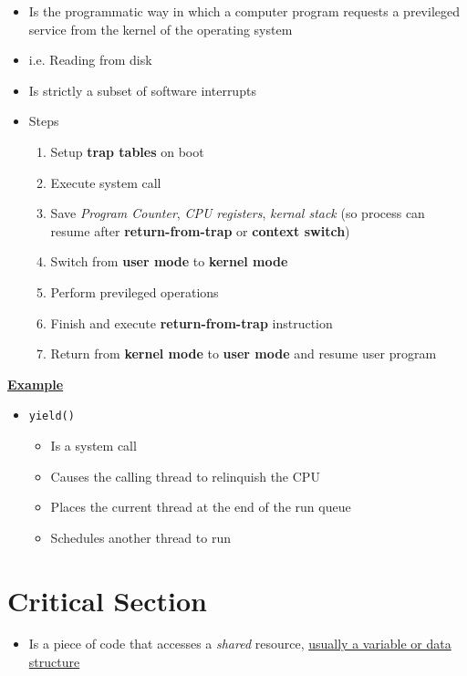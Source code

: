 \documentclass[12pt]{article}
\begin{document}
\begin{itemize}
    \item Is the programmatic way in which a computer program requests a previleged service from the kernel of the operating system
    \item i.e. Reading from disk
    \item Is strictly a subset of software interrupts
    \item Steps

    \begin{enumerate}[1)]
        \item Setup \textbf{trap tables} on boot
        \item Execute system call
        \item Save \textit{Program Counter}, \textit{CPU registers}, \textit{kernal stack} (so process can resume after \textbf{return-from-trap}
        or \textbf{context switch})
        \item Switch from \textbf{user mode} to \textbf{kernel mode}
        \item Perform previleged operations
        \item Finish and execute \textbf{return-from-trap} instruction
        \item Return from \textbf{kernel mode} to \textbf{user mode} and resume user program
    \end{enumerate}
\end{itemize}

\underline{\textbf{Example}}

\begin{itemize}
    \item \texttt{yield()}
    \begin{itemize}
        \item Is a system call
        \item Causes the calling thread to relinquish the CPU
        \item Places the current thread at the end of the run queue
        \item Schedules another thread to run
    \end{itemize}
\end{itemize}

\section{Critical Section}

\begin{itemize}
    \item Is a piece of code that accesses a \textit{shared} resource,
    \ul{usually a variable or data structure}
\end{itemize}
\end{document}
